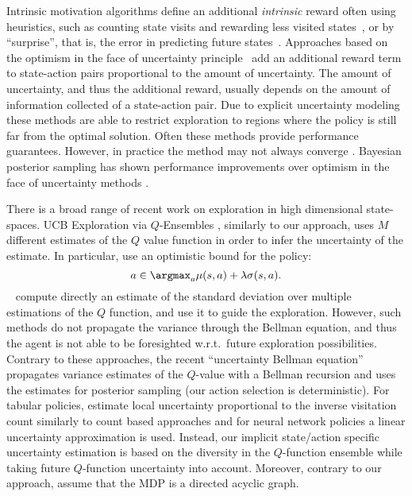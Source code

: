 Intrinsic motivation
algorithms define an additional \textsl{intrinsic} reward often using heuristics, such as counting state visits and
rewarding less visited states~\cite{ostrovski2017count,bellemare2016unifying}, or by
``surprise'', that is, the error in predicting future
states~\cite{pathak2017curiosity}. Approaches based on the optimism in the face of uncertainty
principle~\cite{lai1985asymptotically,kearns2002near,brafman2002r} add an additional reward term to
state-action pairs
proportional to the amount of uncertainty. The amount of uncertainty, and thus the additional reward,
usually depends on the amount of information collected of a state-action pair. Due to explicit
uncertainty modeling these methods are able to restrict exploration to regions where the policy is
still far from the optimal solution. Often these methods provide performance guarantees. However, in
practice the method may not always converge \cite{jaksch2010near,osband2016deep}. 
Bayesian posterior sampling has shown performance improvements over optimism in the face of uncertainty methods \cite{strens2000bayesian,osband2013more,grande2014}.

There is a broad range of recent work on exploration in high dimensional
state-spaces. UCB Exploration via $Q$-Ensembles \cite{chen2017ucb},
similarly to our approach, uses $M$ different estimates of the $Q$
value function in order to infer the uncertainty of the estimate. In
particular, \cite{chen2017ucb} use an optimistic bound for the policy:
\begin{equation}
a \in \argmax_a \mu(s,a) + \lambda \sigma(s,a) \nonumber.
\end{equation}
\citeauthor{chen2017ucb}~ compute directly an estimate of the standard deviation
over multiple estimations of the $Q$ function, and use it to guide
the exploration. However, such methods do not propagate the variance
through the Bellman equation, and thus the agent is not able to be
foresighted w.r.t.\ future exploration possibilities. Contrary to these approaches, the 
recent ``uncertainty
Bellman equation'' \cite{odonoghue18a} propagates variance estimates of the $Q$-value 
with a Bellman recursion and uses the estimates for posterior sampling (our action selection is deterministic). For tabular policies, \citeauthor{odonoghue18a} estimate
local uncertainty proportional to the inverse visitation count similarly to count based
approaches and for neural network policies a linear uncertainty approximation is used. Instead, our
implicit state/action specific uncertainty estimation is based on the diversity in the $Q$-function ensemble while taking future $Q$-function uncertainty into account.
 Moreover, contrary to our
approach,
\citeauthor{odonoghue18a} assume that the MDP is a directed acyclic graph.

